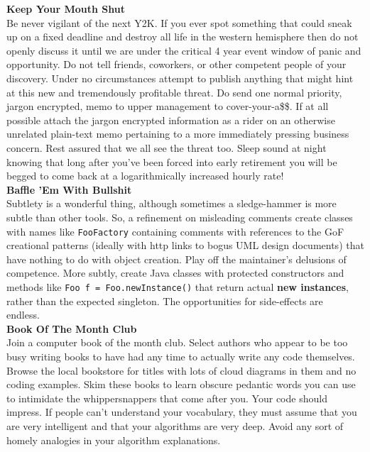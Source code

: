 \documentclass[11pt,twoside,a4paper]{article}
\begin{document}
\textbf{Keep Your Mouth Shut}~\\
Be never vigilant of the next Y2K. If you ever spot something that could sneak up on a fixed deadline and destroy all life in the western hemisphere then do not openly discuss it until we are under the critical 4 year event window of panic and opportunity. Do not tell friends, coworkers, or other competent people of your discovery. Under no circumstances attempt to publish anything that might hint at this new and tremendously profitable threat. Do send one normal priority, jargon encrypted, memo to upper management to cover-your-a\$\$. If at all possible attach the jargon encrypted information as a rider on an otherwise unrelated plain-text memo pertaining to a more immediately pressing business concern. Rest assured that we all see the threat too. Sleep sound at night knowing that long after you've been forced into early retirement you will be begged to come back at a logarithmically increased hourly rate!~\\ 

\textbf{Baffle 'Em With Bullshit}~\\
Subtlety is a wonderful thing, although sometimes a sledge-hammer is more subtle than other tools. So, a refinement on misleading comments create classes with names like \texttt{FooFactory} containing comments with references to the GoF creational patterns (ideally with http links to bogus UML design documents) that have nothing to do with object creation. Play off the maintainer's delusions of competence. More subtly, create Java classes with protected constructors and methods like \texttt{Foo f = Foo.newInstance()} that return actual \textbf{new instances}, rather than the expected singleton. The opportunities for side-effects are endless.~\\ 

\textbf{Book Of The Month Club}~\\
Join a computer book of the month club. Select authors who appear to be too busy writing books to have had any time to actually write any code themselves. Browse the local bookstore for titles with lots of cloud diagrams in them and no coding examples. Skim these books to learn obscure pedantic words you can use to intimidate the whippersnappers that come after you. Your code should impress. If people can't understand your vocabulary, they must assume that you are very intelligent and that your algorithms are very deep. Avoid any sort of homely analogies in your algorithm explanations. ~\\
\end{document}
